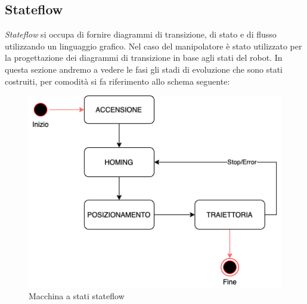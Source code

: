 \subsection{Stateflow}
\textit{Stateflow} si occupa di fornire diagrammi di transizione, di stato e di flusso utilizzando un linguaggio grafico. Nel caso del manipolatore è stato utilizzato per la progettazione dei diagrammi di transizione in base agli stati del robot. In questa sezione andremo a vedere le fasi gli stadi di evoluzione che sono stati costruiti, per comodità si fa riferimento allo schema seguente:
\begin{figure}[ht]
	\begin{center}
		\includegraphics[scale=0.6]{Immagini/Sperimentale/statemachine}
		\caption{Macchina a stati stateflow
			\label{fig:macchinaStati}}
	\end{center}
\end{figure}
